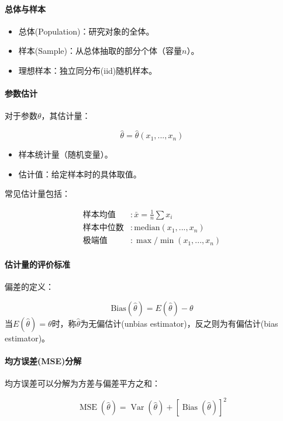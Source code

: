 \paragraph*{总体与样本}
\begin{itemize}
	\item 总体(Population)：研究对象的全体。
	\item 样本(Sample)：从总体抽取的部分个体（容量$n$）。
	\item 理想样本：独立同分布(iid)随机样本。
\end{itemize}

\paragraph*{参数估计}
\begin{flushleft}
对于参数$\theta$，其估计量：
\end{flushleft}
\begin{equation}
	\hat{\theta} = \hat{\theta}(x_1,...,x_n) 
\end{equation}
\begin{itemize}
	\item 样本统计量（随机变量）。
	\item 估计值：给定样本时的具体取值。
\end{itemize}

\begin{flushleft}
常见估计量包括：
\end{flushleft}
\begin{align*}
	\text{样本均值} & : \bar{x} = \frac{1}{n}\sum x_i \\
	\text{样本中位数} & : \mathrm{median}(x_1,...,x_n) \\
	\text{极端值} & : \max/\min(x_1,...,x_n)
\end{align*}

\paragraph*{估计量的评价标准}
\begin{flushleft}
偏差的定义：
\end{flushleft}
\begin{equation}
	\mathrm{Bias}(\hat{\theta}) = E(\hat{\theta}) - \theta 
\end{equation}
当$E(\hat{\theta}) = \theta$时，称$\hat{\theta}$为无偏估计(unbias estimator)，反之则为有偏估计(bias estimator)。

\paragraph*{均方误差(MSE)分解}
\begin{flushleft}
均方误差可以分解为方差与偏差平方之和：
\end{flushleft}
\begin{equation}
	\operatorname{MSE}(\hat{\theta})=\operatorname{Var}(\hat{\theta})+[\operatorname{Bias}(\hat{\theta})]^{2} 
\end{equation}

